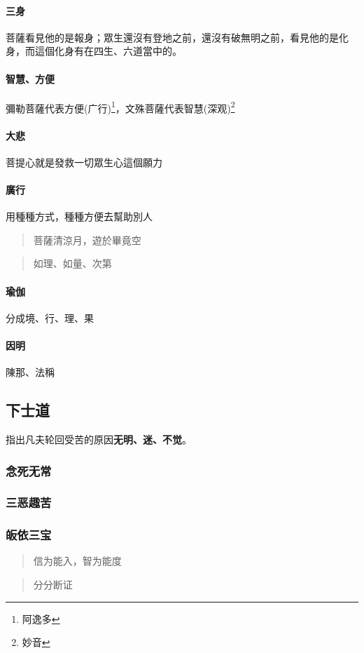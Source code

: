 \paragraph{三身}
菩薩看見他的是報身；眾生還沒有登地之前，還沒有破無明之前，看見他的是化身，而這個化身有在四生、六道當中的。
\paragraph{智慧、方便}
彌勒菩薩代表方便(广行)\footnote{阿逸多}，文殊菩薩代表智慧(深观)\footnote{妙音}
\paragraph{大悲}
菩提心就是發救一切眾生心這個願力
\paragraph{廣行}
用種種方式，種種方便去幫助別人
\begin{quote}
  菩薩清涼月，遊於畢竟空
\end{quote}
\begin{quote}
  如理、如量、次第
\end{quote}
\paragraph{瑜伽}分成境、行、理、果
\paragraph{因明}陳那、法稱



\subsection{下士道}
指出凡夫轮回受苦的原因\textbf{无明、迷、不觉}。

\subsubsection{念死无常}
\subsubsection{三恶趣苦}
\subsubsection{皈依三宝}
\begin{quote}
  信为能入，智为能度
\end{quote}
\begin{quote}
  分分断证
\end{quote}
